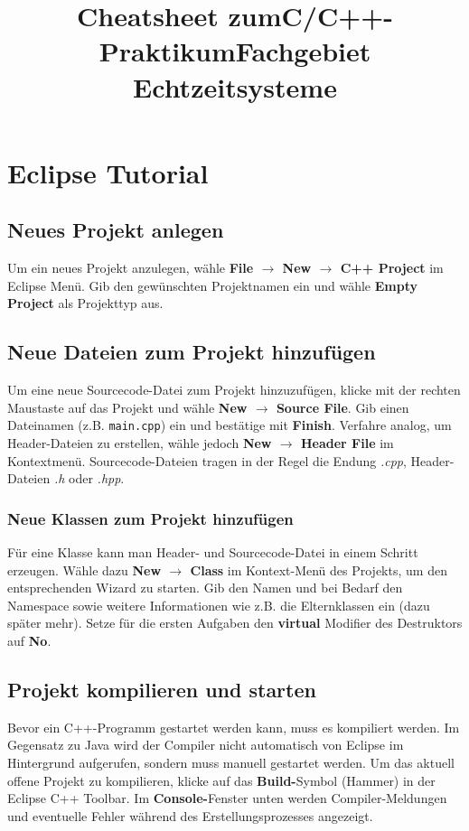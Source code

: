 \documentclass[
  accentcolor=tud1c,	%
  colorbacktitle,		%
  inverttitle,			%
  german,
  twoside
]{tudreport}
\title{Cheatsheet zum\linebreak[1]C/C++-Praktikum\linebreak[1] Fachgebiet Echtzeitsysteme}
\begin{document}
\maketitle

\chapter{Eclipse Tutorial}

\section{Neues Projekt anlegen}
Um ein neues Projekt anzulegen, wähle \textbf{File $\rightarrow$ New $\rightarrow$ C++ Project} im Eclipse Menü.
Gib den gewünschten Projektnamen ein und wähle \textbf{Empty Project} als Projekttyp aus.

\section{Neue Dateien zum Projekt hinzufügen}
Um eine neue Sourcecode-Datei zum Projekt hinzuzufügen, klicke mit der rechten Maustaste auf das Projekt und wähle \textbf{New $\rightarrow$ Source File}.
Gib einen Dateinamen (z.B. \texttt{main.cpp}) ein und bestätige mit \textbf{Finish}.
Verfahre analog, um Header-Dateien zu erstellen, wähle jedoch \textbf{New $\rightarrow$ Header File} im Kontextmenü.
Sourcecode-Dateien tragen in der Regel die Endung \emph{.cpp}, Header-Dateien \emph{.h} oder \emph{.hpp}.

\subsection{Neue Klassen zum Projekt hinzufügen}
Für eine Klasse kann man Header- und Sourcecode-Datei in einem Schritt erzeugen.
Wähle dazu \textbf{New $\rightarrow$ Class} im Kontext-Menü des Projekts, um den entsprechenden Wizard zu starten.
Gib den Namen und bei Bedarf den Namespace sowie weitere Informationen wie z.B. die Elternklassen ein (dazu später mehr).
Setze für die ersten Aufgaben den \textbf{virtual} Modifier des Destruktors auf \textbf{No}.


\section{Projekt kompilieren und starten}
Bevor ein C++-Programm gestartet werden kann, muss es kompiliert werden.
Im Gegensatz zu Java wird der Compiler nicht automatisch von Eclipse im Hintergrund aufgerufen, sondern muss manuell gestartet werden.
Um das aktuell offene Projekt zu kompilieren, klicke auf das \textbf{Build-}Symbol (\glqq Hammer\grqq) in der Eclipse C++ Toolbar.
Im \textbf{Console-}Fenster unten werden Compiler-Meldungen und eventuelle Fehler während des Erstellungsprozesses angezeigt.
\end{document}
